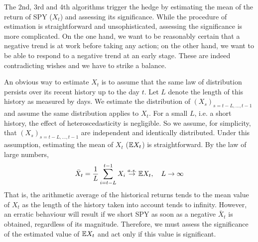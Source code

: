 \documentclass{article}
\begin{document}
The 2nd, 3rd and 4th algorithms trigger the hedge by estimating
the mean of the return of SPY ($X_t$) and assessing its
significance. While the procedure of estimation is straightforward and
unsophisticated, assessing the significance is more complicated. On
the one hand, we want to be reasonably certain that a negative trend
is at work before taking any action; on the other hand, we want to be
able to respond to a negative trend at an early stage. These are
indeed contradicting wishes and we have to strike a balance.

An obvious way to estimate $X_t$ is to assume that the same law of
distribution persists over its recent history up to the day $t$. Let
$L$ denote the length of this history as measured by days. We estimate
the distribution of $(X_s)_{s=t-L, \dots, t-1}$ and assume the same
distribution applies to $X_t$. For a small $L$, i.e. a short history,
the effect of heteroscedasticity is negligible. So we assume, for
simplicity, that $(X_s)_{s=t-L, \dots, t-1}$ are independent and
identically distributed. Under this assumption, estimating the mean of
$X_t$ ($\mathbb{E} X_t$) is straightforward. By the law of large numbers,
\[
  \bar X_t = {1 \over L} \sum_{i=t-L}^{t-1} X_i \overset{a.s.}{\to} \mathbb{E} X_t,
  \quad
  L \to \infty
\]
That is, the arithmetic average of the historical returns tends to the
mean value of $X_t$ as the length of the history taken into account
tends to infinity. However, an erratic behaviour will result if we
short SPY as soon as a negative $\bar X_t$ is obtained, regardless of
its magnitude. Therefore, we must assess the significance of the
estimated value of $\mathbb{E} X_t$ and act only if this value is significant.
\end{document}
